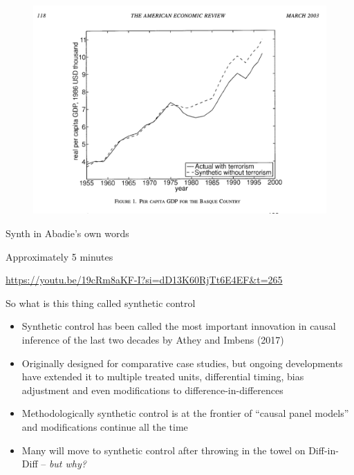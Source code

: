 \documentclass{beamer}
\begin{document}
\begin{frame}{}

\begin{figure}
\includegraphics[scale=0.5]{./lecture_includes/basque_figure1}
\end{figure}

\end{frame}

\begin{frame}{Synth in Abadie's own words}

Approximately 5 minutes

\url{https://youtu.be/19cRm8aKF-I?si=dD13K60RjTt6E4EF&t=265}

\end{frame}

\begin{frame}{So what is this thing called synthetic control}
	
	\begin{itemize}
	\item Synthetic control has been called the most important innovation in causal inference of the last two decades by Athey and Imbens (2017)
	\item Originally designed for comparative case studies, but ongoing developments have extended it to multiple treated units, differential timing, bias adjustment and even modifications to difference-in-differences
	\item Methodologically synthetic control is at the frontier of ``causal panel models'' and modifications continue all the time
	\item Many will move to synthetic control after throwing in the towel on Diff-in-Diff -- \emph{but why?}
	\end{itemize}
\end{frame}
	
\end{document}
